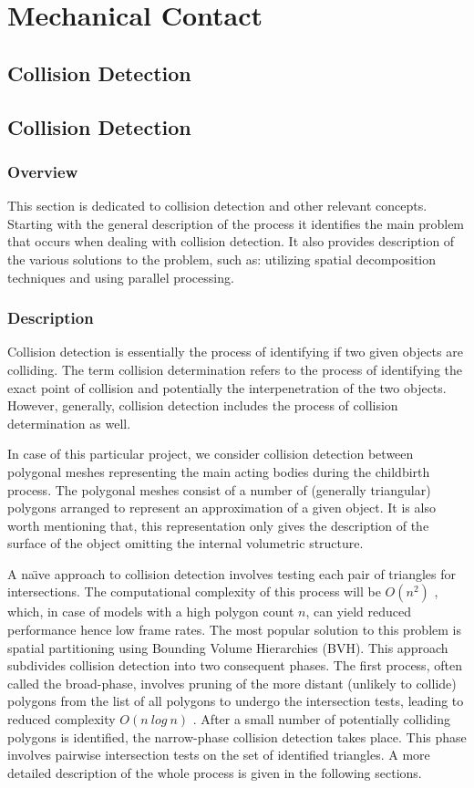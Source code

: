 \chapter{Mechanical Contact}\label{methodology-contact}

\section{Collision Detection}

\section{Collision Detection}
  \subsection{Overview}
  This section is dedicated to collision detection and other relevant concepts. Starting with the general description of the process it identifies the main problem that occurs when dealing with collision detection. It also provides description of the various solutions to the problem, such as: utilizing spatial decomposition techniques and using parallel processing.
  \subsection{Description}
    Collision detection is essentially the process of identifying if two given objects are colliding. The term collision determination refers to the process of identifying the exact point of collision and potentially the interpenetration of the two objects. However, generally, collision detection includes the process of collision determination as well.

    In case of this particular project, we consider collision detection between polygonal meshes representing the main acting bodies during the childbirth process. The polygonal meshes consist of a number of (generally triangular) polygons arranged to represent an approximation of a given object. It is also worth mentioning that, this representation only gives the description of the surface of the object omitting the internal volumetric structure.


A na\"{\i}ve approach to collision detection involves testing each pair of triangles for intersections. The computational complexity of this process will be $O(n^2)$ \citep{gpuGems32}, which, in case of models with a high polygon count $n$, can yield reduced performance hence low frame rates. The most popular solution to this problem is spatial partitioning using Bounding Volume Hierarchies (BVH). This approach subdivides collision detection into two consequent phases. The first process, often called the broad-phase, involves pruning of the more distant (unlikely to collide) polygons from the list of all polygons to undergo the intersection tests, leading to reduced complexity $O(n~log~n)$ \citep{MPI}. After a small number of potentially colliding polygons is identified, the narrow-phase collision detection takes place. This phase involves pairwise intersection tests on the set of identified triangles. A more detailed description of the whole process is given in the following sections.

